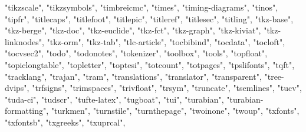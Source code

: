 \documentclass[
]{article}
\newenvironment{Shaded}{\begin{snugshade}}{\end{snugshade}}
\newcommand{\NormalTok}[1]{#1}
\newcommand{\StringTok}[1]{\textcolor[rgb]{0.31,0.60,0.02}{#1}}
\begin{document}
\begin{Shaded}
\begin{Highlighting}[]
\StringTok{"tikzscale"}\NormalTok{, }\StringTok{"tikzsymbols"}\NormalTok{, }\StringTok{"timbreicmc"}\NormalTok{, }\StringTok{"times"}\NormalTok{, }\StringTok{"timing{-}diagrams"}\NormalTok{, }
\StringTok{"tinos"}\NormalTok{, }\StringTok{"tipfr"}\NormalTok{, }\StringTok{"titlecaps"}\NormalTok{, }\StringTok{"titlefoot"}\NormalTok{, }\StringTok{"titlepic"}\NormalTok{, }\StringTok{"titleref"}\NormalTok{, }
\StringTok{"titlesec"}\NormalTok{, }\StringTok{"titling"}\NormalTok{, }\StringTok{"tkz{-}base"}\NormalTok{, }\StringTok{"tkz{-}berge"}\NormalTok{, }\StringTok{"tkz{-}doc"}\NormalTok{, }\StringTok{"tkz{-}euclide"}\NormalTok{, }
\StringTok{"tkz{-}fct"}\NormalTok{, }\StringTok{"tkz{-}graph"}\NormalTok{, }\StringTok{"tkz{-}kiviat"}\NormalTok{, }\StringTok{"tkz{-}linknodes"}\NormalTok{, }\StringTok{"tkz{-}orm"}\NormalTok{, }
\StringTok{"tkz{-}tab"}\NormalTok{, }\StringTok{"tlc{-}article"}\NormalTok{, }\StringTok{"tocbibind"}\NormalTok{, }\StringTok{"tocdata"}\NormalTok{, }\StringTok{"tocloft"}\NormalTok{, }
\StringTok{"tocvsec2"}\NormalTok{, }\StringTok{"todo"}\NormalTok{, }\StringTok{"todonotes"}\NormalTok{, }\StringTok{"tokenizer"}\NormalTok{, }\StringTok{"toolbox"}\NormalTok{, }\StringTok{"tools"}\NormalTok{, }
\StringTok{"topfloat"}\NormalTok{, }\StringTok{"topiclongtable"}\NormalTok{, }\StringTok{"topletter"}\NormalTok{, }\StringTok{"toptesi"}\NormalTok{, }\StringTok{"totcount"}\NormalTok{, }
\StringTok{"totpages"}\NormalTok{, }\StringTok{"tpslifonts"}\NormalTok{, }\StringTok{"tqft"}\NormalTok{, }\StringTok{"tracklang"}\NormalTok{, }\StringTok{"trajan"}\NormalTok{, }\StringTok{"tram"}\NormalTok{, }
\StringTok{"translations"}\NormalTok{, }\StringTok{"translator"}\NormalTok{, }\StringTok{"transparent"}\NormalTok{, }\StringTok{"tree{-}dvips"}\NormalTok{, }\StringTok{"trfsigns"}\NormalTok{, }
\StringTok{"trimspaces"}\NormalTok{, }\StringTok{"trivfloat"}\NormalTok{, }\StringTok{"trsym"}\NormalTok{, }\StringTok{"truncate"}\NormalTok{, }\StringTok{"tsemlines"}\NormalTok{, }
\StringTok{"tucv"}\NormalTok{, }\StringTok{"tuda{-}ci"}\NormalTok{, }\StringTok{"tudscr"}\NormalTok{, }\StringTok{"tufte{-}latex"}\NormalTok{, }\StringTok{"tugboat"}\NormalTok{, }\StringTok{"tui"}\NormalTok{, }
\StringTok{"turabian"}\NormalTok{, }\StringTok{"turabian{-}formatting"}\NormalTok{, }\StringTok{"turkmen"}\NormalTok{, }\StringTok{"turnstile"}\NormalTok{, }\StringTok{"turnthepage"}\NormalTok{, }
\StringTok{"twoinone"}\NormalTok{, }\StringTok{"twoup"}\NormalTok{, }\StringTok{"txfonts"}\NormalTok{, }\StringTok{"txfontsb"}\NormalTok{, }\StringTok{"txgreeks"}\NormalTok{, }\StringTok{"txuprcal"}\NormalTok{, }

\end{Highlighting}
\end{Shaded}
\end{document}
